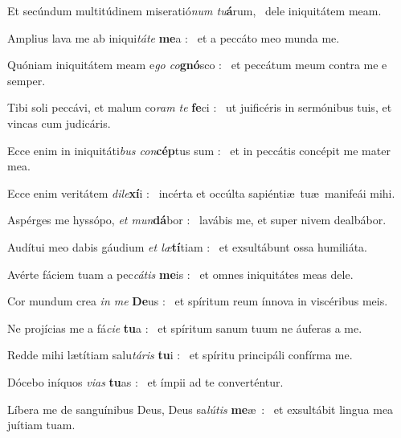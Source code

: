 \documentclass[12pt]{article} %
\newenvironment{psalmtext}{\leftskip 0.25in}{\vspace{2 mm}}
\let\oldgresixstar\gresixstar
\renewcommand{\gresixstar}{\textcolor{benred8}{\oldgresixstar}}
\begin{document}
\begin{psalmtext}

Et sec\'{u}ndum multit\'{u}dinem miserati\'{o}\emph{num tu}\textbf{\'{a}}rum, \gresixstar\ dele iniquit\'{a}tem meam.

Amplius lava me ab iniqui\emph{t\'{a}te} \textbf{me}a : \gresixstar\ et a pecc\'{a}to meo munda me.

Qu\'{o}niam iniquit\'{a}tem meam e\emph{go co}\textbf{gn\'{o}}sco : \gresixstar\ et pecc\'{a}tum meum contra me e semper.

Tibi soli pecc\'{a}vi, et malum co\emph{ram te} \textbf{fe}ci : \gresixstar\ ut juific\'{e}ris in serm\'{o}nibus tuis, et vincas cum judic\'{a}ris.

Ecce enim in iniquit\'{a}ti\emph{bus con}\textbf{c\'{e}p}tus sum : \gresixstar\ et in pecc\'{a}tis conc\'{e}pit me mater mea.

Ecce enim verit\'{a}tem \emph{dile}\textbf{x\'{i}}i : \gresixstar\ inc\'{e}rta et occ\'{u}lta sapi\'{e}nti\ae\  tu\ae\ manife\'{a}i mihi.

Asp\'{e}rges me hyss\'{o}po, \emph{et mun}\textbf{d\'{a}}bor : \gresixstar\ lav\'{a}bis me, et super nivem dealb\'{a}bor.

Aud\'{i}tui meo dabis g\'{a}udium \emph{et l\ae}\textbf{t\'{i}}tiam : \gresixstar\ et exsult\'{a}bunt ossa humili\'{a}ta.

Av\'{e}rte f\'{a}ciem tuam a pec\emph{c\'{a}tis} \textbf{me}is : \gresixstar\ et omnes iniquit\'{a}tes meas dele.

Cor mundum crea \emph{in me} \textbf{De}us : \gresixstar\ et sp\'{i}ritum reum \'{i}nnova in visc\'{e}ribus meis.

Ne proj\'{i}cias me a f\'{a}\emph{cie} \textbf{tu}a : \gresixstar\ et sp\'{i}ritum sanum tuum ne \'{a}uferas a me.

Redde mihi l\ae t\'{i}tiam salu\emph{t\'{a}ris} \textbf{tu}i : \gresixstar\ et sp\'{i}ritu princip\'{a}li conf\'{i}rma me.

D\'{o}cebo in\'{i}quos \emph{vias} \textbf{tu}as : \gresixstar\ et \'{i}mpii ad te convert\'{e}ntur.

L\'{i}bera me de sangu\'{i}nibus Deus, Deus sa\emph{l\'{u}tis} \textbf{me}\ae\ : \gresixstar\ et exsult\'{a}bit lingua mea ju\'{i}tiam tuam.


\end{psalmtext}
\end{document}
